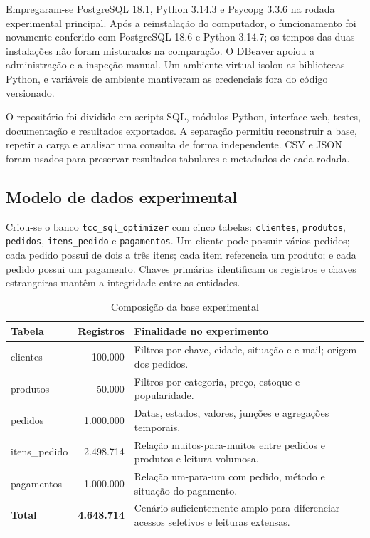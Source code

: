 \documentclass{UNESC}
\newcommand{\codigo}[1]{\texttt{#1}}
\begin{document}
Empregaram-se PostgreSQL 18.1, Python 3.14.3 e Psycopg 3.3.6 na rodada experimental principal. Após a reinstalação do computador, o funcionamento foi novamente conferido com PostgreSQL 18.6 e Python 3.14.7; os tempos das duas instalações não foram misturados na comparação. O DBeaver apoiou a administração e a inspeção manual. Um ambiente virtual isolou as bibliotecas Python, e variáveis de ambiente mantiveram as credenciais fora do código versionado.

O repositório foi dividido em scripts SQL, módulos Python, interface web, testes, documentação e resultados exportados. A separação permitiu reconstruir a base, repetir a carga e analisar uma consulta de forma independente. CSV e JSON foram usados para preservar resultados tabulares e metadados de cada rodada.

\subsection{Modelo de dados experimental}

Criou-se o banco \codigo{tcc\_sql\_optimizer} com cinco tabelas: \codigo{clientes}, \codigo{produtos}, \codigo{pedidos}, \codigo{itens\_pedido} e \codigo{pagamentos}. Um cliente pode possuir vários pedidos; cada pedido possui de dois a três itens; cada item referencia um produto; e cada pedido possui um pagamento. Chaves primárias identificam os registros e chaves estrangeiras mantêm a integridade entre as entidades.

\begin{table}[H]
\centering
\caption{Composição da base experimental}
\label{tab:base}
\small
\begin{tabularx}{\textwidth}{l r Y}
\toprule
\textbf{Tabela} & \textbf{Registros} & \textbf{Finalidade no experimento}\\
\midrule
clientes & 100.000 & Filtros por chave, cidade, situação e e-mail; origem dos pedidos.\\
produtos & 50.000 & Filtros por categoria, preço, estoque e popularidade.\\
pedidos & 1.000.000 & Datas, estados, valores, junções e agregações temporais.\\
itens\_pedido & 2.498.714 & Relação muitos-para-muitos entre pedidos e produtos e leitura volumosa.\\
pagamentos & 1.000.000 & Relação um-para-um com pedido, método e situação do pagamento.\\
\midrule
\textbf{Total} & \textbf{4.648.714} & Cenário suficientemente amplo para diferenciar acessos seletivos e leituras extensas.\\
\bottomrule
\end{tabularx}
\end{table}
\end{document}
